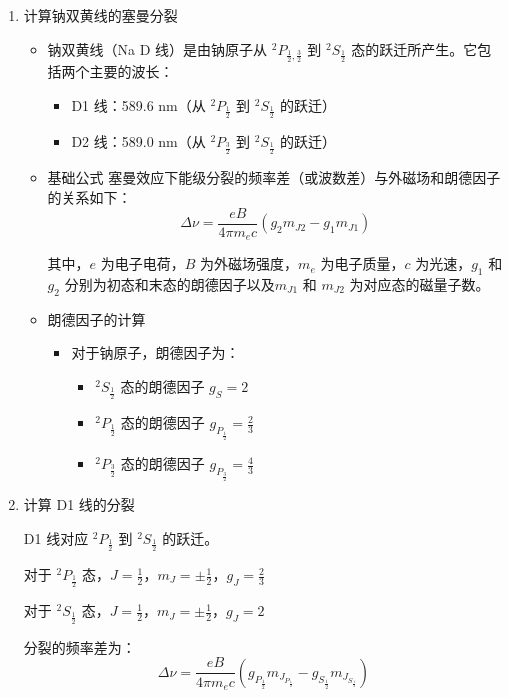 \documentclass[dvipsnames, svgnames,a4paper,11pt]{article}
\begin{document}
	\begin{enumerate}
		\item 计算钠双黄线的塞曼分裂
		\begin{itemize}
			\item 钠双黄线（Na D 线）是由钠原子从 $^2P_{\frac{1}{2}, \frac{3}{2}}$ 到 $^2S_{\frac{1}{2}}$ 态的跃迁所产生。它包括两个主要的波长：
			\begin{itemize}
				\item D1 线：589.6 nm（从 $^2P_{\frac{1}{2}}$ 到 $^2S_{\frac{1}{2}}$ 的跃迁）
				\item D2 线：589.0 nm（从 $^2P_{\frac{3}{2}}$ 到 $^2S_{\frac{1}{2}}$ 的跃迁）
			\end{itemize}
			
			\item 基础公式
			塞曼效应下能级分裂的频率差（或波数差）与外磁场和朗德因子的关系如下：
			\[
			\Delta \nu = \frac{e B}{4 \pi m_e c} (g_2 m_{J2} - g_1 m_{J1})
			\]
			
			其中，$e$ 为电子电荷，$B$ 为外磁场强度，$m_e$ 为电子质量，$c$ 为光速，$g_1$ 和 $g_2$ 分别为初态和末态的朗德因子以及$m_{J1}$ 和 $m_{J2}$ 为对应态的磁量子数。
			
			\item 朗德因子的计算
			\begin{itemize}
				\item 对于钠原子，朗德因子为：
				\begin{itemize}
					\item $^2S_{\frac{1}{2}}$ 态的朗德因子 $g_S = 2$
					\item $^2P_{\frac{1}{2}}$ 态的朗德因子 $g_{P_{\frac{1}{2}}} = \frac{2}{3}$
					\item $^2P_{\frac{3}{2}}$ 态的朗德因子 $g_{P_{\frac{3}{2}}} = \frac{4}{3}$
				\end{itemize}
			\end{itemize}
		\end{itemize}
		
		\item 计算 D1 线的分裂
		
		D1 线对应 $^2P_{\frac{1}{2}}$ 到 $^2S_{\frac{1}{2}}$ 的跃迁。
		
		对于 $^2P_{\frac{1}{2}}$ 态，$J = \frac{1}{2}$，$m_J = \pm \frac{1}{2}$，$g_J = \frac{2}{3}$
		
		对于 $^2S_{\frac{1}{2}}$ 态，$J = \frac{1}{2}$，$m_J = \pm \frac{1}{2}$，$g_J = 2$
		
		分裂的频率差为：
		\[
		\Delta \nu = \frac{e B}{4 \pi m_e c} \left( g_{P_{\frac{1}{2}}} m_{J_{P_{\frac{1}{2}}}} - g_{S_{\frac{1}{2}}} m_{J_{S_{\frac{1}{2}}}} \right)
		\]
		

\end{enumerate}
\end{document}
